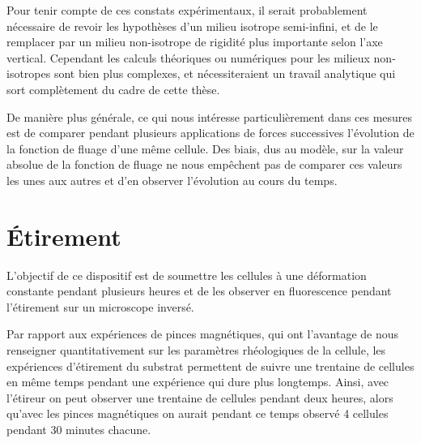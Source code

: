 \documentclass{report}
\begin{document}
	Pour tenir compte de ces constats expérimentaux, il serait probablement nécessaire de revoir les hypothèses d'un milieu isotrope semi-infini, et de le remplacer par un milieu non-isotrope de rigidité plus importante selon l'axe vertical. 
	Cependant les calculs théoriques ou numériques pour les milieux non-isotropes sont bien plus complexes, et nécessiteraient un travail analytique qui sort complètement du cadre de cette thèse. 
	
	De manière plus générale, ce qui nous intéresse particulièrement dans ces mesures est de comparer pendant plusieurs applications de forces successives l'évolution de la fonction de fluage d'une même cellule. Des biais, dus au modèle, sur la valeur absolue de la fonction de fluage ne nous empêchent pas de comparer ces valeurs les unes aux autres et d'en observer l'évolution au cours du temps. 
	
	
	
\section{\'Etirement}
	L'objectif de ce dispositif est de soumettre les cellules à une déformation constante pendant plusieurs heures et de les observer en fluorescence pendant l'étirement sur un microscope inversé. 
	
	Par rapport aux expériences de pinces magnétiques, qui ont l'avantage de nous renseigner quantitativement sur les paramètres rhéologiques de la cellule, les expériences d'étirement du substrat permettent de suivre une trentaine de cellules en même temps pendant une expérience qui dure plus longtemps. Ainsi, avec l'étireur on peut observer une trentaine de cellules pendant deux heures, alors qu'avec les pinces magnétiques on aurait pendant ce temps observé 4 cellules pendant 30 minutes chacune. 
	
\end{document}
